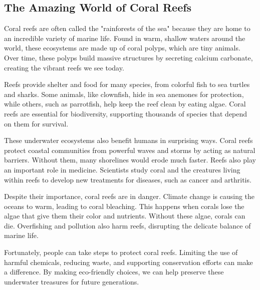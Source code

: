 \documentclass[12pt]{article}
\begin{document}
\onehalfspacing

\subsection*{The Amazing World of Coral Reefs}

\begin{tcolorbox}[colframe=black!40, colback=gray!5]
\begin{spacing}{1.15}
Coral reefs are often called the "rainforests of the sea" because they are home to an incredible variety of marine life. Found in warm, shallow waters around the world, these ecosystems are made up of coral polyps, which are tiny animals. Over time, these polyps build massive structures by secreting calcium carbonate, creating the vibrant reefs we see today.

Reefs provide shelter and food for many species, from colorful fish to sea turtles and sharks. Some animals, like clownfish, hide in sea anemones for protection, while others, such as parrotfish, help keep the reef clean by eating algae. Coral reefs are essential for biodiversity, supporting thousands of species that depend on them for survival.

These underwater ecosystems also benefit humans in surprising ways. Coral reefs protect coastal communities from powerful waves and storms by acting as natural barriers. Without them, many shorelines would erode much faster. Reefs also play an important role in medicine. Scientists study coral and the creatures living within reefs to develop new treatments for diseases, such as cancer and arthritis.

Despite their importance, coral reefs are in danger. Climate change is causing the oceans to warm, leading to coral bleaching. This happens when corals lose the algae that give them their color and nutrients. Without these algae, corals can die. Overfishing and pollution also harm reefs, disrupting the delicate balance of marine life.

Fortunately, people can take steps to protect coral reefs. Limiting the use of harmful chemicals, reducing waste, and supporting conservation efforts can make a difference. By making eco-friendly choices, we can help preserve these underwater treasures for future generations.
\end{spacing}
\end{tcolorbox}

\vspace{1cm}
\end{document}
